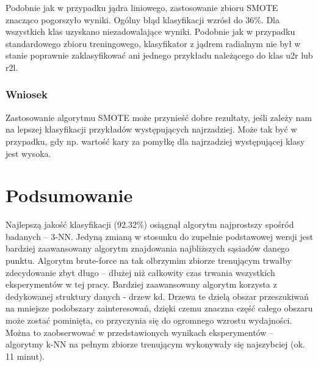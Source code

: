 \documentclass[a4paper, 12pt]{article}
\begin{document}
Podobnie jak w przypadku jądra liniowego, zastosowanie zbioru SMOTE znacząco pogorszyło wyniki. Ogólny błąd klasyfikacji wzrósł do 36\%. Dla wszystkich klas uzyskano niezadowalające wyniki. Podobnie jak w przypadku standardowego zbioru treningowego, klasyfikator z jądrem radialnym nie był w stanie poprawnie zaklasyfikować ani jednego przykładu należącego do klas u2r lub r2l.

\subsubsection{Wniosek}

Zastosowanie algorytmu SMOTE może przynieść dobre rezultaty, 
jeśli zależy nam na lepszej klasyfikacji przykładów występujących najrzadziej.
Może tak być w przypadku, gdy np. wartość kary za pomyłkę dla najrzadziej występującej klasy
jest wysoka.

\section{Podsumowanie}

Najlepszą jakość klasyfikacji (92.32\%) osiągnął algorytm najprostszy spośród badanych -- 3-NN.
Jedyną zmianą w stosunku do zupełnie podstawowej wersji jest bardziej zaawansowany algorytm
znajdowania najbliższych sąsiadów danego punktu. Algorytm brute-force na tak olbrzymim zbiorze
trenującym trwałby zdecydowanie zbyt długo -- dłużej niż całkowity czas trwania wszystkich 
eksperymentów w tej pracy. Bardziej zaawansowany algorytm korzysta z dedykowanej struktury
danych - drzew kd. Drzewa te dzielą obszar przeszukiwań na mniejsze podobszary zainteresowań, dzięki 
czemu znaczna część całego obszaru może zostać pominięta, 
co przyczynia się do ogromnego wzrostu wydajności. Można to zaobserwować w przedstawionych
wynikach eksperymentów -- algorytmy
k-NN na pełnym zbiorze trenującym wykonywały się najszybciej (ok. 11 minut).


\end{document}
